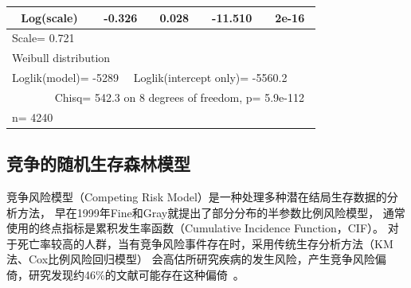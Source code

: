 \documentclass[lang=cn,11pt,a4paper,cite=super,AutoFakeBold]{elegantpaper}
\begin{document}
\begin{table}[htb]
{\begin{tabular}{ccccc}
   Log(scale)                   & -0.326               & 0.028                & -11.510              & 2e-16                 \\
   \bottomrule
   \multicolumn{5}{l}{Scale=
     0.721}                                                                                        \\
   \multicolumn{5}{l}{Weibull
     distribution}                                                                                \\
   \multicolumn{5}{l}{Loglik(model)= -5289~~ Loglik(intercept only)= -5560.2}                                              \\
   \multicolumn{5}{l}{~~~~~~~ Chisq= 542.3 on 8 degrees of freedom,
     p= 5.9e-112~}                                          \\
   \multicolumn{1}{l}{n= 4240~} & \multicolumn{1}{l}{} & \multicolumn{1}{l}{} & \multicolumn{1}{l}{} & \multicolumn{1}{l}{}  \\

   \end{tabular}}
\end{table}


\subsection{竞争的随机生存森林模型}
竞争风险模型（Competing Risk Model）是一种处理多种潜在结局生存数据的分析方法，
早在1999年Fine和Gray就提出了部分分布的半参数比例风险模型，
通常使用的终点指标是累积发生率函数（Cumulative Incidence Function，CIF）。
对于死亡率较高的人群，当有竞争风险事件存在时，采用传统生存分析方法（KM法、Cox比例风险回归模型）
会高估所研究疾病的发生风险，产生竞争风险偏倚，研究发现约46\%的文献可能存在这种偏倚~\cite{cr}。
\end{document}
